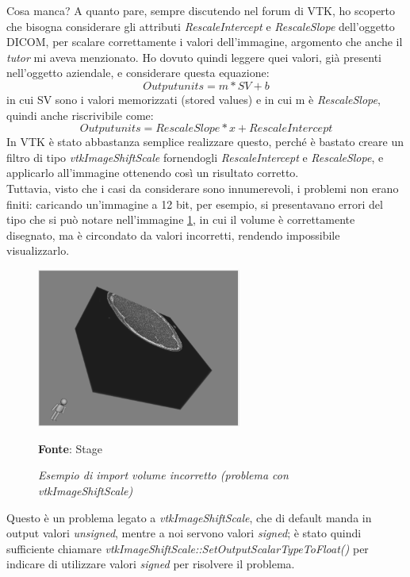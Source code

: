 Cosa manca? A quanto pare, sempre discutendo nel forum di VTK, ho scoperto che bisogna considerare gli attributi \emph{RescaleIntercept} e \emph{RescaleSlope} dell'oggetto DICOM, per scalare correttamente i valori dell'immagine, argomento che anche il \emph{tutor} mi aveva menzionato. Ho dovuto quindi leggere quei valori, già presenti nell'oggetto aziendale, e considerare questa equazione:
\[ Output units = m *SV + b \]
in cui SV sono i valori memorizzati (stored values) e in cui m è \emph{RescaleSlope}, quindi anche riscrivibile come: 
\[ Output units = RescaleSlope * x + RescaleIntercept \]
In VTK è stato abbastanza semplice realizzare questo, perché è bastato creare un filtro di tipo \emph{vtkImageShiftScale} fornendogli \emph{RescaleIntercept} e \emph{RescaleSlope}, e applicarlo all'immagine ottenendo così un risultato corretto.
\\
Tuttavia, visto che i casi da considerare sono innumerevoli, i problemi non erano finiti: caricando un'immagine a 12 bit, per esempio, si presentavano errori del tipo che si può notare nell'immagine \ref{fig: Volume Wrong Value}, in cui il volume è correttamente disegnato, ma è circondato da valori incorretti, rendendo impossibile visualizzarlo.

\begin{figure}[h]
    \centering
    \includegraphics[width=0.6\textwidth]{immagini/svolgimento/volumebroken12bit.png}
    \caption{\textit{Esempio di import volume incorretto (problema con vtkImageShiftScale)}}
    \textbf{Fonte}: Stage
    \label{fig: Volume Wrong Value}
\end{figure}

Questo è un problema legato a \emph{vtkImageShiftScale}, che di default manda in output valori \emph{unsigned}, mentre a noi servono valori \emph{signed}; è stato quindi sufficiente chiamare \emph{vtkImageShiftScale::SetOutputScalarTypeToFloat()} per indicare di utilizzare valori \emph{signed} per risolvere il problema.

